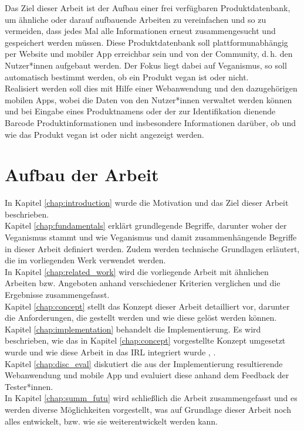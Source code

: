 Das Ziel dieser Arbeit ist der Aufbau einer frei verfügbaren
Produktdatenbank,
um ähnliche oder darauf aufbauende Arbeiten zu vereinfachen und so
zu vermeiden, dass jedes Mal alle Informationen erneut zusammengesucht
und gespeichert werden müssen.
Diese Produktdatenbank soll
plattformunabhängig per Website und mobiler App erreichbar sein und von
der Community, d.\,h. den Nutzer*innen aufgebaut werden.
Der Fokus liegt dabei auf Veganismus, so soll automatisch bestimmt
werden, ob ein Produkt
vegan ist oder nicht.\\
Realisiert werden soll dies mit Hilfe einer Webanwendung und
den dazugehörigen mobilen Apps, wobei die Daten von den Nutzer*innen
verwaltet werden können und bei Eingabe eines Produktnamens oder der
zur Identifikation dienende Barcode
Produktinformationen und insbesondere
Informationen darüber, ob und wie das Produkt vegan ist oder
nicht
angezeigt werden.

\section{Aufbau der Arbeit}

In Kapitel \ref{chap:introduction} wurde die Motivation und das Ziel
dieser Arbeit beschrieben.\\
Kapitel \ref{chap:fundamentals} erklärt grundlegende Begriffe,
darunter woher der Veganismus stammt und wie
Veganismus und damit zusammenhängende Begriffe in dieser
Arbeit definiert werden. Zudem werden
technische Grundlagen erläutert, die im vorliegenden Werk verwendet
werden.\\
In Kapitel \ref{chap:related_work} wird die vorliegende Arbeit mit
ähnlichen Arbeiten bzw. Angeboten anhand verschiedener Kriterien
verglichen und die Ergebnisse zusammengefasst.\\
Kapitel \ref{chap:concept} stellt das Konzept dieser Arbeit
detailliert vor, darunter die Anforderungen, die gestellt werden und
wie diese gelöst werden können.\\
Kapitel \ref{chap:implementation} behandelt die Implementierung.
Es wird beschrieben, wie das in Kapitel \ref{chap:concept} vorgestellte
Konzept umgesetzt wurde und wie diese Arbeit in das
\ac{IRL}
integriert wurde , \cite{sskk09}.\\
Kapitel \ref{chap:disc_eval} diskutiert die aus der Implementierung
resultierende Webanwendung und mobile App und evaluiert diese
anhand dem Feedback der Tester*innen.\\
In Kapitel \ref{chap:summ_futu} wird schließlich die Arbeit
zusammengefasst und es werden diverse Möglichkeiten vorgestellt, was
auf Grundlage dieser Arbeit noch alles entwickelt, bzw.
wie sie weiterentwickelt werden kann.



